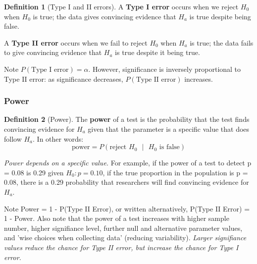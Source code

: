 \documentclass[12pt, a4paper]{article}
\theoremstyle{definition}
\newtheorem{definition}{Definition}
\begin{document}
\begin{definition}[Type I and II errors]
    A \textbf{Type I error} occurs when we reject $H_0$ when $H_0$ is true; the data gives convincing evidence that $H_a$ is true despite being false.
    
    A \textbf{Type II error} occurs when we fail to reject $H_0$ when $H_a$ is true; the data fails to give convincing evidence that $H_a$ is true despite it being true.
\end{definition}

Note $P(\textrm{Type I error}) = \alpha$.
However, significance is inversely proportional to Type II error: as significance decreases, $P(\textrm{Type II error})$ increases.

\subsubsection{Power}
\begin{definition}[Power]
    The \textbf{power} of a test is the probability that the test finds convincing evidence for $H_a$ given that the parameter is a specific value that does follow $H_a$. In other words:
    \[\textrm{power} = P(\textrm{reject $H_0$ $|$ $H_0$ is false})\]
\end{definition}

\textit{Power depends on a specific value.} For example, if the power of a test to detect p = 0.08 is 0.29 given $H_0: p = 0.10$, if the true proportion in the population is p = 0.08, there is a 0.29 probability that researchers will find convincing evidence for $H_a$.

Note Power = 1 - P(Type II Error), or written alternatively, P(Type II Error) = 1 - Power. Also note that the power of a test increases with higher sample number, higher signifiance level, further null and alternative parameter values, and 'wise choices when collecting data' (reducing variability).
\textit{Larger signifiance values reduce the chance for Type II error, but increase the chance for Type I error.}
\end{document}
